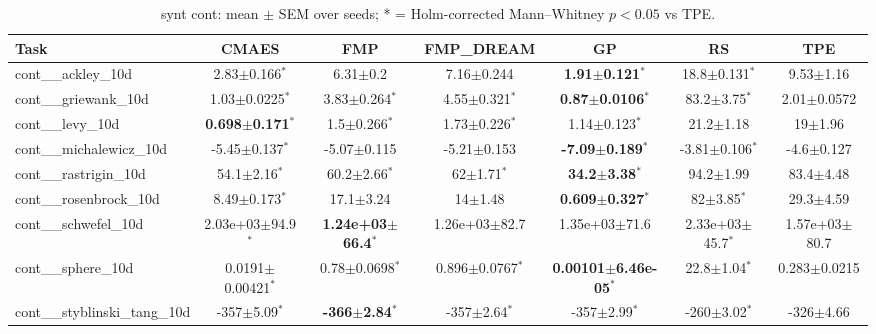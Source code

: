 \begin{table}[t]
\caption{synt cont: mean $\pm$ SEM over seeds; * = Holm-corrected Mann--Whitney $p<0.05$ vs TPE.}
\label{tab:synt_cont}
\begin{center}\small
\begin{tabular}{lcccccc}
\hline
Task & CMAES & FMP & FMP\_DREAM & GP & RS & TPE \\
\hline
cont\_\_ackley\_10d & 2.83$\pm$0.166$^{*}$ & 6.31$\pm$0.2 & 7.16$\pm$0.244 & \textbf{1.91$\pm$0.121}$^{*}$ & 18.8$\pm$0.131$^{*}$ & 9.53$\pm$1.16 \\
cont\_\_griewank\_10d & 1.03$\pm$0.0225$^{*}$ & 3.83$\pm$0.264$^{*}$ & 4.55$\pm$0.321$^{*}$ & \textbf{0.87$\pm$0.0106}$^{*}$ & 83.2$\pm$3.75$^{*}$ & 2.01$\pm$0.0572 \\
cont\_\_levy\_10d & \textbf{0.698$\pm$0.171}$^{*}$ & 1.5$\pm$0.266$^{*}$ & 1.73$\pm$0.226$^{*}$ & 1.14$\pm$0.123$^{*}$ & 21.2$\pm$1.18 & 19$\pm$1.96 \\
cont\_\_michalewicz\_10d & -5.45$\pm$0.137$^{*}$ & -5.07$\pm$0.115 & -5.21$\pm$0.153 & \textbf{-7.09$\pm$0.189}$^{*}$ & -3.81$\pm$0.106$^{*}$ & -4.6$\pm$0.127 \\
cont\_\_rastrigin\_10d & 54.1$\pm$2.16$^{*}$ & 60.2$\pm$2.66$^{*}$ & 62$\pm$1.71$^{*}$ & \textbf{34.2$\pm$3.38}$^{*}$ & 94.2$\pm$1.99 & 83.4$\pm$4.48 \\
cont\_\_rosenbrock\_10d & 8.49$\pm$0.173$^{*}$ & 17.1$\pm$3.24 & 14$\pm$1.48 & \textbf{0.609$\pm$0.327}$^{*}$ & 82$\pm$3.85$^{*}$ & 29.3$\pm$4.59 \\
cont\_\_schwefel\_10d & 2.03e+03$\pm$94.9$^{*}$ & \textbf{1.24e+03$\pm$66.4}$^{*}$ & 1.26e+03$\pm$82.7 & 1.35e+03$\pm$71.6 & 2.33e+03$\pm$45.7$^{*}$ & 1.57e+03$\pm$80.7 \\
cont\_\_sphere\_10d & 0.0191$\pm$0.00421$^{*}$ & 0.78$\pm$0.0698$^{*}$ & 0.896$\pm$0.0767$^{*}$ & \textbf{0.00101$\pm$6.46e-05}$^{*}$ & 22.8$\pm$1.04$^{*}$ & 0.283$\pm$0.0215 \\
cont\_\_styblinski\_tang\_10d & -357$\pm$5.09$^{*}$ & \textbf{-366$\pm$2.84}$^{*}$ & -357$\pm$2.64$^{*}$ & -357$\pm$2.99$^{*}$ & -260$\pm$3.02$^{*}$ & -326$\pm$4.66 \\
\hline
\end{tabular}
\end{center}
\end{table}
